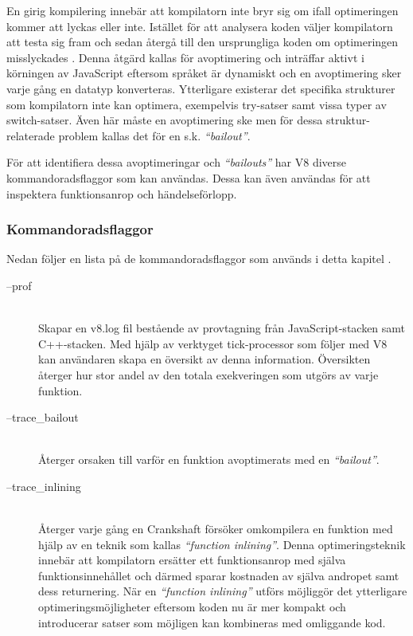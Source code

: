 En girig kompilering innebär att kompilatorn inte bryr sig om ifall
optimeringen kommer att lyckas eller inte. Istället för att analysera koden
väljer kompilatorn att testa sig fram och sedan återgå till den ursprungliga
koden om optimeringen misslyckades \citep{mk10}. Denna åtgärd kallas för
avoptimering och inträffar aktivt i körningen av JavaScript eftersom språket
är dynamiskt och en avoptimering sker varje gång en datatyp konverteras.
Ytterligare existerar det specifika strukturer som kompilatorn inte kan
optimera, exempelvis try-satser samt vissa typer av switch-satser. Även här
måste en avoptimering ske men för dessa struktur-relaterade problem kallas det
för en s.k. \textit{``bailout''}.

För att identifiera dessa avoptimeringar och \textit{``bailouts''} har V8 diverse
kommandoradsflaggor som kan användas. Dessa kan även användas för att
inspektera funktionsanrop och händelseförlopp.

\subsubsection{Kommandoradsflaggor}

Nedan följer en lista på de kommandoradsflaggor som används i detta kapitel
\citep{v8profiler}.

\begin{description}
  \item[--prof] \hfill \\
    Skapar en v8.log fil bestående av provtagning från JavaScript-stacken
    samt C++-stacken. Med hjälp av verktyget tick-processor som följer med V8
    kan användaren skapa en översikt av denna information. Översikten återger
    hur stor andel av den totala exekveringen som utgörs av varje funktion.
  \item[--trace_bailout] \hfill \\
    Återger orsaken till varför en funktion avoptimerats med en
    \textit{``bailout''}.
  \item[--trace_inlining] \hfill \\
    Återger varje gång en Crankshaft försöker omkompilera en funktion med
    hjälp av en teknik som kallas \textit{``function inlining''}. Denna
    optimeringsteknik innebär att kompilatorn ersätter ett funktionsanrop med
    själva funktionsinnehållet och därmed sparar kostnaden av själva andropet
    samt dess returnering. När en \textit{``function inlining''} utförs
    möjliggör det ytterligare optimeringsmöjligheter eftersom koden nu är mer
    kompakt och introducerar satser som möjligen kan kombineras med omliggande
    kod.
\end{description}

